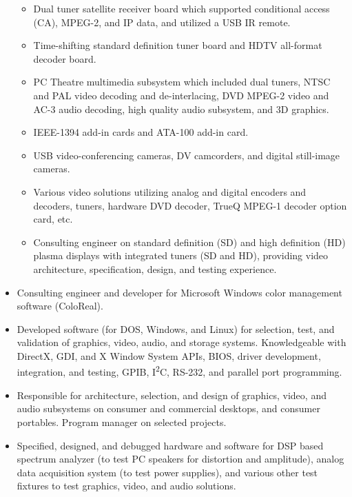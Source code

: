 \documentclass[10pt,letterpaper,oneside]{report}
\begin{document}
\begin{itemize}
\begin {itemize}
      \item Dual tuner satellite receiver board which supported conditional
        access (CA), MPEG-2, and IP data, and utilized a USB IR remote.

      \item Time-shifting standard definition tuner board and HDTV all-format
        decoder board.

      \item PC Theatre multimedia subsystem which included dual tuners, NTSC and
        PAL video decoding and de-interlacing, DVD MPEG-2 video and AC-3 audio
        decoding, high quality audio subsystem, and 3D graphics.

      \item IEEE-1394 add-in cards and ATA-100 add-in card.

      \item USB video-conferencing cameras, DV camcorders, and digital
        still-image cameras.

      \item Various video solutions utilizing analog and digital encoders and
        decoders, tuners, hardware DVD decoder, TrueQ MPEG-1 decoder option
        card, etc.

      \item Consulting engineer on standard definition (SD) and high definition
        (HD) plasma displays with integrated tuners (SD and HD), providing video
        architecture, specification, design, and testing experience.
    \end{itemize}

  \item Consulting engineer and developer for Microsoft Windows color
    management software (ColoReal\texttrademark).

  \item Developed software (for DOS, Windows, and Linux) for selection, test,
    and validation of graphics, video, audio, and storage systems.
    Knowledgeable with DirectX, GDI, and X Window System APIs, BIOS, driver
    development, integration, and testing, GPIB, I\textsuperscript{2}C, RS-232,
    and parallel port programming.

  \item Responsible for architecture, selection, and design of graphics, video,
    and audio subsystems on consumer and commercial desktops, and consumer
    portables. Program manager on selected projects.

  \item Specified, designed, and debugged hardware and software for DSP based
    spectrum analyzer (to test PC speakers for distortion and amplitude), analog
    data acquisition system (to test power supplies), and various other test
    fixtures to test graphics, video, and audio solutions.
\end{itemize}
\end{document}
